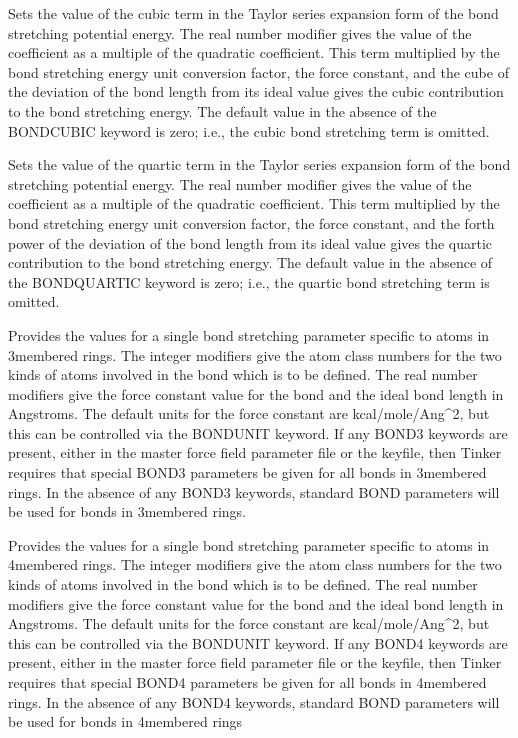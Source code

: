 \documentclass[letterpaper,11pt,english]{sphinxmanual}
\begin{document}
  Sets the value of the cubic term in the Taylor series expansion form of the bond stretching potential energy. The real number modifier gives the value of the coefficient as a multiple of the quadratic coefficient. This term multiplied by the bond stretching energy unit conversion factor, the force constant, and the cube of the deviation of the bond length from its ideal value gives the cubic contribution to the bond stretching energy. The default value in the absence of the BOND\sphinxhyphen{}CUBIC keyword is zero; i.e., the cubic bond stretching term is omitted.

  Sets the value of the quartic term in the Taylor series expansion form of the bond stretching potential energy. The real number modifier gives the value of the coefficient as a multiple of the quadratic coefficient. This term multiplied by the bond stretching energy unit conversion factor, the force constant, and the forth power of the deviation of the bond length from its ideal value gives the quartic contribution to the bond stretching energy. The default value in the absence of the BOND\sphinxhyphen{}QUARTIC keyword is zero; i.e., the quartic bond stretching term is omitted.

  Provides the values for a single bond stretching parameter specific to atoms in 3\sphinxhyphen{}membered rings. The integer modifiers give the atom class numbers for the two kinds of atoms involved in the bond which is to be defined. The real number modifiers give the force constant value for the bond and the ideal bond length in Angstroms. The default units for the force constant are kcal/mole/Ang\textasciicircum{}2, but this can be controlled via the BONDUNIT keyword. If any BOND3 keywords are present, either in the master force field parameter file or the keyfile, then Tinker requires that special BOND3 parameters be given for all bonds in 3\sphinxhyphen{}membered rings. In the absence of any BOND3 keywords, standard BOND parameters will be used for bonds in 3\sphinxhyphen{}membered rings.

  Provides the values for a single bond stretching parameter specific to atoms in 4\sphinxhyphen{}membered rings. The integer modifiers give the atom class numbers for the two kinds of atoms involved in the bond which is to be defined. The real number modifiers give the force constant value for the bond and the ideal bond length in Angstroms. The default units for the force constant are kcal/mole/Ang\textasciicircum{}2, but this can be controlled via the BONDUNIT keyword. If any BOND4 keywords are present, either in the master force field parameter file or the keyfile, then Tinker requires that special BOND4 parameters be given for all bonds in 4\sphinxhyphen{}membered rings. In the absence of any BOND4 keywords, standard BOND parameters will be used for bonds in 4\sphinxhyphen{}membered rings
\end{document}
